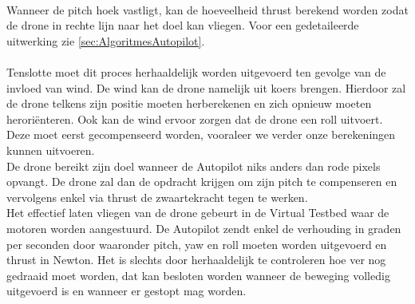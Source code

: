 \\
Wanneer de pitch hoek vastligt, kan de hoeveelheid thrust berekend worden zodat de drone in rechte lijn naar het doel kan vliegen. Voor een gedetaileerde uitwerking zie \ref{sec:AlgoritmesAutopilot}.
\\
\\
Tenslotte moet dit proces herhaaldelijk worden uitgevoerd ten gevolge van de invloed van wind. De wind kan de drone namelijk uit koers brengen. Hierdoor zal de drone telkens zijn positie moeten herberekenen en zich opnieuw moeten herori\"enteren. Ook kan de wind ervoor zorgen dat de drone een roll uitvoert. Deze moet eerst gecompenseerd worden, vooraleer we verder onze berekeningen kunnen uitvoeren.
\\
De drone bereikt zijn doel wanneer de Autopilot niks anders dan rode pixels opvangt. De drone zal dan de opdracht krijgen om zijn pitch te compenseren en vervolgens enkel via thrust de zwaartekracht tegen te werken.
\\
Het effectief laten vliegen van de drone gebeurt in de Virtual Testbed waar de motoren worden aangestuurd. De Autopilot zendt enkel de verhouding in graden per seconden door waaronder pitch, yaw en roll moeten worden uitgevoerd en thrust in Newton. Het is slechts door herhaaldelijk te controleren hoe ver nog gedraaid moet worden, dat kan besloten worden wanneer de beweging volledig uitgevoerd is en wanneer er gestopt mag worden.